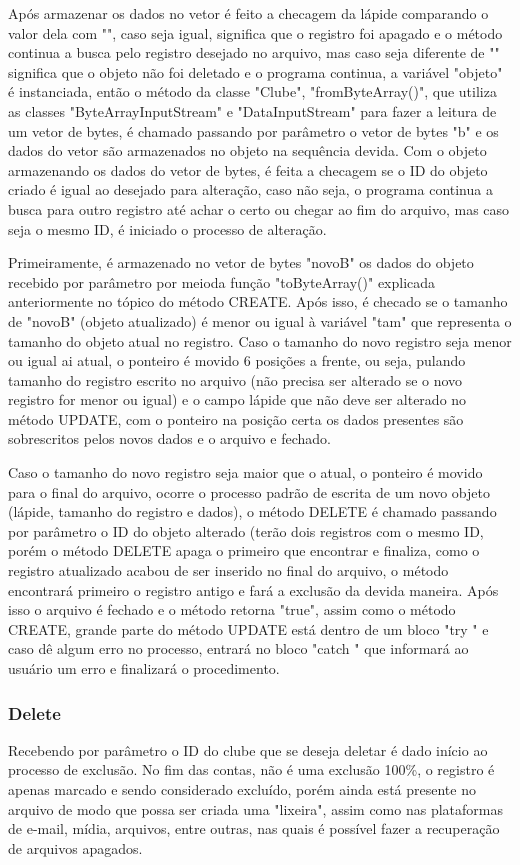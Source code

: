 \documentclass[12pt]{article}
\begin{document}
Após armazenar os dados no vetor é feito a checagem da lápide comparando o valor dela com "", caso seja igual, significa que o registro foi apagado e o método continua a busca pelo registro desejado no arquivo, mas caso seja diferente de "" significa que o objeto não foi deletado e o programa continua, a variável "objeto" é instanciada, então o método da classe "Clube", "fromByteArray()", que utiliza as classes "ByteArrayInputStream" e "DataInputStream" para fazer a leitura de um vetor de bytes, é chamado passando por parâmetro o vetor de bytes "b" e os dados do vetor são armazenados no objeto na sequência devida. Com o objeto armazenando os dados do vetor de bytes, é feita a checagem se o ID do objeto criado é igual ao desejado para alteração, caso não seja, o programa continua a busca para outro registro até achar o certo ou chegar ao fim do arquivo, mas caso seja o mesmo ID, é iniciado o processo de alteração.

Primeiramente, é armazenado no vetor de bytes "novoB" os dados do objeto recebido por parâmetro por meioda função "toByteArray()" explicada anteriormente no tópico do método CREATE. Após isso, é checado se o tamanho de "novoB" (objeto atualizado) é menor ou igual à variável "tam" que representa o tamanho do objeto atual no registro. Caso o tamanho do novo registro seja menor ou igual ai atual, o ponteiro é movido 6 posições a frente, ou seja, pulando tamanho do registro escrito no arquivo (não precisa ser alterado se o novo registro for menor ou igual) e o campo lápide que não deve ser alterado no método UPDATE, com o ponteiro na posição certa os dados presentes são sobrescritos pelos novos dados e o arquivo e fechado. 

Caso o tamanho do novo registro seja maior que o atual, o ponteiro é movido para o final do arquivo, ocorre o processo padrão de escrita de um novo objeto (lápide, tamanho do registro e dados), o método DELETE é chamado passando por parâmetro o ID do objeto alterado (terão dois registros com o mesmo ID, porém o método DELETE apaga o primeiro que encontrar e finaliza, como o registro atualizado acabou de ser inserido no final do arquivo, o método encontrará primeiro o registro antigo e fará a exclusão da devida maneira. Após isso o arquivo é fechado e o método retorna "true", assim como o método CREATE, grande parte do método UPDATE está dentro de um bloco "try {}" e caso dê algum erro no processo, entrará no bloco "catch {}" que informará ao usuário um erro e finalizará o procedimento.

\subsubsection{Delete}
Recebendo por parâmetro o ID do clube que se deseja deletar é dado início ao processo de exclusão. No fim das contas, não é uma exclusão 100\%, o registro é apenas marcado e sendo considerado excluído, porém ainda está presente no arquivo de modo que possa ser criada uma "lixeira", assim como nas plataformas de e-mail, mídia, arquivos, entre outras, nas quais é possível fazer a recuperação de arquivos apagados.
\end{document}
